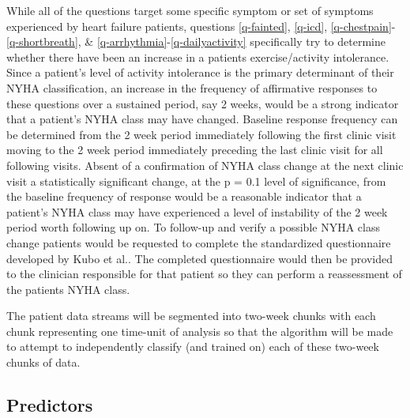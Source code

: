 \documentclass[]{article}
\begin{document}
While all of the questions target some specific symptom or set of symptoms experienced by heart failure patients, questions \ref{q-fainted}, \ref{q-icd}, \ref{q-chestpain}-\ref{q-shortbreath}, \& \ref{q-arrhythmia}-\ref{q-dailyactivity} specifically try to determine whether there have been an increase in a patients exercise/activity intolerance. Since a patient's level of activity intolerance is the primary determinant of their NYHA classification, an increase in the frequency of affirmative responses to these questions over a sustained period, say 2 weeks, would be a strong indicator that a patient's NYHA class may have changed. Baseline response frequency can be determined from the 2 week period immediately following the first clinic visit moving to the 2 week period immediately preceding the last clinic visit for all following visits. Absent of a confirmation of NYHA class change at the next clinic visit a statistically significant change, at the p = 0.1 level of significance, from the baseline frequency of response would be a reasonable indicator that a patient's NYHA class may have experienced a level of instability of the 2 week period worth following up on. To follow-up and verify a possible NYHA class change patients would be requested to complete the standardized questionnaire developed by Kubo et al.\@\cite{Kubo2004}. The completed questionnaire would then be provided to the clinician responsible for that patient so they can perform a reassessment of the patients NYHA class.

The patient data streams will be segmented into two-week chunks with each chunk representing one time-unit of analysis so that the algorithm will be made to attempt to independently classify (and trained on) each of these two-week chunks of data.

\subsection{Predictors} %
\end{document}
